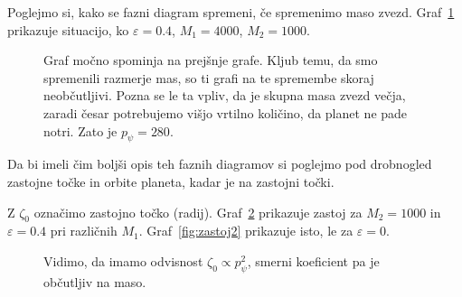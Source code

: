 \documentclass[12pt, a4paper]{article}
\begin{document}
Poglejmo si, kako se fazni diagram spremeni, \v ce spremenimo maso zvezd. Graf~\ref{fig:M4000} prikazuje
situacijo, ko $\varepsilon = 0.4$, $M_1 = 4000$, $M_2 = 1000$.
\begin{figure}[H]\centering
	
	\caption{Graf mo\v cno spominja na prej\v snje grafe. Kljub temu, da smo spremenili razmerje mas, so
		ti grafi na te spremembe skoraj neob\v cutljivi. Pozna se le ta vpliv, da je skupna masa zvezd ve\v cja,
		zaradi \v cesar potrebujemo vi\v sjo vrtilno koli\v cino, da planet ne pade notri. Zato je $p_\psi = 280$.}
	\label{fig:M4000}
\end{figure}
Da bi imeli \v cim bolj\v si opis teh faznih diagramov si poglejmo pod drobnogled zastojne to\v cke in orbite
planeta, kadar je na zastojni to\v cki.

Z $\zeta_0$ ozna\v cimo zastojno to\v cko (radij). Graf~\ref{fig:zastoj1} prikazuje zastoj za $M_2 = 1000$ in
$\varepsilon = 0.4$ pri razli\v cnih $M_1$. Graf~\ref{fig:zastoj2} prikazuje isto, le za $\varepsilon = 0$.
\begin{figure}[H]\centering
	
	\caption{Vidimo, da imamo odvisnost $\zeta_0 \propto p_\psi^2$, smerni koeficient pa je ob\v cutljiv na maso.}
	\label{fig:zastoj1}
\end{figure}
\end{document}
